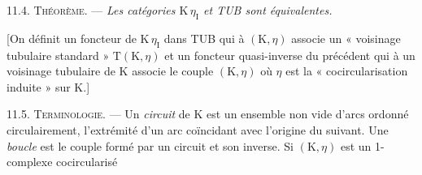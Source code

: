 11.4. \textsc{Théorème.} --- \textit{Les catégories \(\mathrm{K}\,\eta_{\mathrm{I}}\) et TUB sont équivalentes.}

[On définit un foncteur de \(\mathrm{K}\,\eta_{\mathrm{I}}\) dans TUB qui à \((\mathrm{K},\eta)\) associe un « voisinage tubulaire standard » \(\mathrm{T}(\mathrm{K},\eta)\) et un foncteur quasi-inverse du précédent qui à un voisinage tubulaire de \(\mathrm{K}\) associe le couple \((\mathrm{K},\eta)\) où \(\eta\) est la « cocircularisation induite » sur \(\mathrm{K}\).]

11.5. \textsc{Terminologie.} --- Un \textit{circuit} de \(\mathrm{K}\) est un ensemble non vide d'arcs ordonné circulairement, l'extrémité d'un arc coïncidant avec l'origine du suivant. Une \textit{boucle} est le couple formé par un circuit et son inverse. Si \((\mathrm{K},\eta)\) est un 1-complexe cocircularisé

